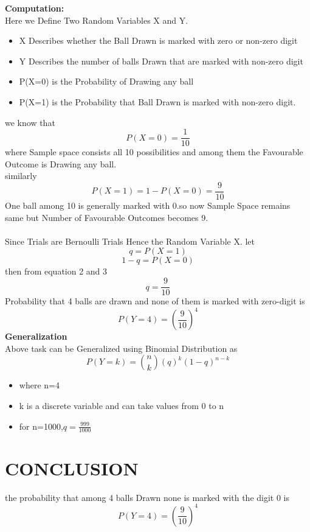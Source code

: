 \documentclass[journal,12pt,twocolumn]{IEEEtran}
\begin{document}
\textbf{Computation:}\\ 
Here we Define Two Random Variables X and Y. \\
\begin{itemize}
    \item X Describes whether the Ball Drawn is marked with zero or non-zero digit\\
    \item Y Describes the number of balls Drawn that are marked with non-zero digit \\
    \item P(X=0) is the Probability of Drawing any ball \\
    \item  P(X=1) is the Probability that Ball Drawn is marked with non-zero digit.\\
\end{itemize}
we know that
\begin{equation}
    P(X=0)=\frac{1}{10}
\end{equation}
where Sample space consists all 10 possibilities and among  them the Favourable Outcome is Drawing any ball.\\
similarly
\begin{equation}
    P(X=1)=1-P(X=0)=\frac{9}{10}
\end{equation}
One ball among 10 is generally marked with 0.so now Sample Space remains same but Number of Favourable Outcomes becomes 9.\\  \\
Since Trials are  Bernoulli Trials Hence the Random Variable X.
let
\begin{equation}
    q=P(X=1)
\end{equation}
\begin{equation}
    1-q=P(X=0)
\end{equation}
then from equation 2 and 3 
\begin{equation}
    q=\frac{9}{10}
\end{equation}
Probability that 4 balls are drawn and none of them is marked with zero-digit is 
\begin{equation}
    P(Y=4)=\left(\frac{9}{10}\right)^4
\end{equation}
\textbf{Generalization}\\
Above task can be Generalized using Binomial Distribution as
\begin{equation}
    P(Y=k)=\binom{n}{k}(q)^k(1-q)^{n-k}
\end{equation}
\begin{itemize}
    \item where n=4
    \item k is a  discrete variable and can take values from 0 to n
    \item for n=1000,$q=\frac{999}{1000}$
\end{itemize}
\section{\textbf{CONCLUSION}}
the probability that among 4 balls Drawn  none is marked with the digit 0 is
\begin{equation}
    P(Y=4)=\left(\frac{9}{10}\right)^4
\end{equation}
\end{document}
